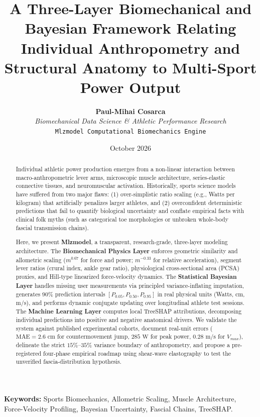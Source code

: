 \documentclass[11pt,a4paper]{article}
\title{\textbf{A Three-Layer Biomechanical and Bayesian Framework Relating Individual Anthropometry and Structural Anatomy to Multi-Sport Power Output}}
\author{
    \textbf{Paul-Mihai Cosarca} \\
    \textit{Biomechanical Data Science \& Athletic Performance Research} \\
    \texttt{Mlzmodel Computational Biomechanics Engine}
}
\date{October 2026}
\begin{document}
\maketitle

\begin{abstract}
Individual athletic power production emerges from a non-linear interaction between macro-anthropometric lever arms, microscopic muscle architecture, series-elastic connective tissues, and neuromuscular activation. Historically, sports science models have suffered from two major flaws: (1) over-simplistic ratio scaling (e.g., Watts per kilogram) that artificially penalizes larger athletes, and (2) overconfident deterministic predictions that fail to quantify biological uncertainty and conflate empirical facts with clinical folk myths (such as categorical toe morphologies or unbroken whole-body fascial transmission chains). 

Here, we present \textbf{Mlzmodel}, a transparent, research-grade, three-layer modeling architecture. The \textbf{Biomechanical Physics Layer} enforces geometric similarity and allometric scaling ($m^{0.67}$ for force and power; $m^{-0.33}$ for relative acceleration), segment lever ratios (crural index, ankle gear ratio), physiological cross-sectional area (PCSA) proxies, and Hill-type linearized force-velocity dynamics. The \textbf{Statistical Bayesian Layer} handles missing user measurements via principled variance-inflating imputation, generates 90\% prediction intervals $[P_{0.05}, P_{0.50}, P_{0.95}]$ in real physical units (Watts, cm, m/s), and performs dynamic conjugate updating over longitudinal athlete test sessions. The \textbf{Machine Learning Layer} computes local TreeSHAP attributions, decomposing individual predictions into positive and negative anatomical drivers. We validate the system against published experimental cohorts, document real-unit errors ($\text{MAE} = 2.6\text{ cm}$ for countermovement jump, $285\text{ W}$ for peak power, $0.28\text{ m/s}$ for $V_{max}$), delineate the strict $15\%\text{--}35\%$ variance boundary of anthropometry, and propose a pre-registered four-phase empirical roadmap using shear-wave elastography to test the unverified fascia-distribution hypothesis.
\end{abstract}

\vspace{0.5em}
\noindent\textbf{Keywords:} Sports Biomechanics, Allometric Scaling, Muscle Architecture, Force-Velocity Profiling, Bayesian Uncertainty, Fascial Chains, TreeSHAP.
\end{document}
